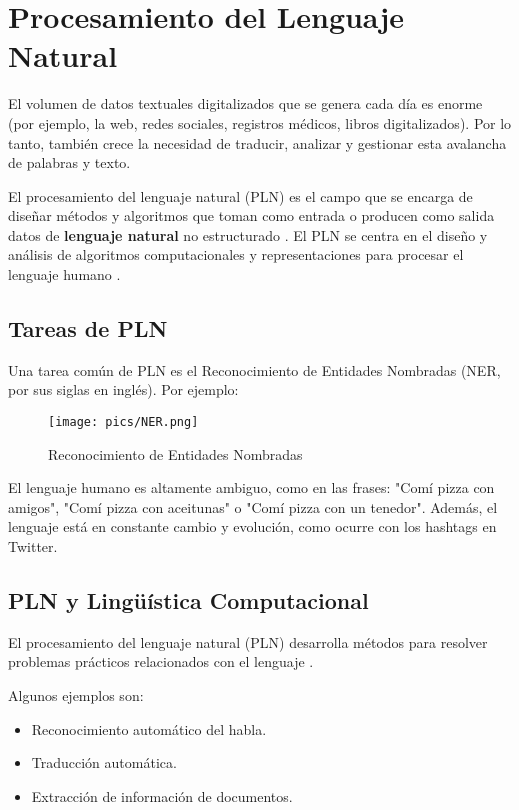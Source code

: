 \documentclass{book}
\begin{document}
\chapter{Procesamiento del Lenguaje Natural}

El volumen de datos textuales digitalizados que se genera cada día es enorme (por ejemplo, la web, redes sociales, registros médicos, libros digitalizados). Por lo tanto, también crece la necesidad de traducir, analizar y gestionar esta avalancha de palabras y texto.

El procesamiento del lenguaje natural (PLN) es el campo que se encarga de diseñar métodos y algoritmos que toman como entrada o producen como salida datos de \textbf{lenguaje natural} no estructurado \cite{goldberg2017neural}. El PLN se centra en el diseño y análisis de algoritmos computacionales y representaciones para procesar el lenguaje humano \cite{jacobbook}.

\section{Tareas de PLN}

Una tarea común de PLN es el Reconocimiento de Entidades Nombradas (NER, por sus siglas en inglés). Por ejemplo:

\begin{figure}[h]
	\texttt{[image: pics/NER.png]}
	\caption{Reconocimiento de Entidades Nombradas}
\end{figure}

El lenguaje humano es altamente ambiguo, como en las frases: "Comí pizza con amigos", "Comí pizza con aceitunas" o "Comí pizza con un tenedor". Además, el lenguaje está en constante cambio y evolución, como ocurre con los hashtags en Twitter.

\section{PLN y Lingüística Computacional}

El procesamiento del lenguaje natural (PLN) desarrolla métodos para resolver problemas prácticos relacionados con el lenguaje \cite{JohnsonMLSS}.

Algunos ejemplos son:

\begin{itemize}
  \item Reconocimiento automático del habla.
  \item Traducción automática.
  \item Extracción de información de documentos.
\end{itemize}
\end{document}
